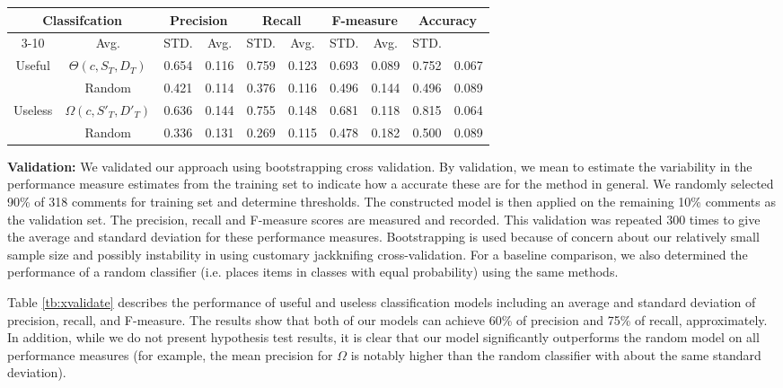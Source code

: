 \begin{table*}[!t]
\caption{Results from bootstrapping cross validation of our classification models against random models}
\small
\centering
\def\arraystretch{1.2}
\begin{tabular}{cccc|cc|cc|cc}
\hline
\multicolumn{2}{c}{Classifcation}   & \multicolumn{2}{c|}{Precision} & \multicolumn{2}{c|}{Recall} & \multicolumn{2}{c|}{F-measure} & \multicolumn{2}{c}{Accuracy} \\ \cline{3-10}
\multicolumn{2}{c}{Models} & Avg. & STD. & Avg. & STD. & Avg. & STD. & Avg. & STD. \\ \hline \hline
\multirow{2}{*}{Useful} & $\Theta(c,S_T,D_T)$    &  0.654 & 0.116 &  0.759 & 0.123 & 0.693 & 0.089 & 0.752 & 0.067 \\ \cline{2-10}
& Random     &  0.421 & 0.114 &  0.376 & 0.116 & 0.496 & 0.144 & 0.496 & 0.089 \\ \hline
\multirow{2}{*}{Useless}  & $\Omega(c,S'_T,D'_T)$  &  0.636 & 0.144 &  0.755 & 0.148 & 0.681 & 0.118 & 0.815 & 0.064 \\ \cline{2-10}
& Random    &  0.336 & 0.131 &  0.269 & 0.115 & 0.478 & 0.182 & 0.500 & 0.089 \\
\hline
\end{tabular}
\label{tb:xvalidate}
\end{table*}


\textbf{Validation:}
We validated our approach using bootstrapping cross validation.
By validation, we mean to estimate the variability in the performance measure estimates from the training set to indicate how a accurate these are for the method in general.
We randomly selected 90\% of 318 comments for training set and determine thresholds.
The constructed model is then applied on the remaining 10\% comments as the validation set.
The precision, recall and F-measure scores are measured and recorded.
This validation was repeated 300 times to give the average and standard deviation for these performance measures.
Bootstrapping is used because of concern about our relatively small sample size and possibly instability in using customary jackknifing cross-validation.
For a baseline comparison, we also determined the performance of a random classifier (i.e. places items in classes with equal probability) using the same methods.

Table \ref{tb:xvalidate} describes the performance of useful and useless classification models including an average and standard deviation of precision, recall, and F-measure.
The results show that both of our models can achieve 60\% of precision and 75\% of recall, approximately.
In addition, while we do not present hypothesis test results, it is clear that our model significantly outperforms the random model on all performance measures (for example, the mean precision for $\Omega$ is notably higher than the random classifier with about the same standard deviation).


